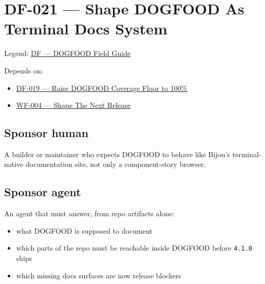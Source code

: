 \chapter{DF-021 --- Shape DOGFOOD As Terminal Docs System}\label{record-082}

\smallskip

Legend: \href{https://github.com/flyingrobots/bijou/blob/1853ad902f6bf219326409e7f743a5a1d6517dbc/docs/legends/DF-dogfood-field-guide.md}{DF --- DOGFOOD Field Guide}

Depends on:

\begin{itemize}
\tightlist
\item
  \href{https://github.com/flyingrobots/bijou/blob/cbd70612140e7a450d764b3c7be1c6af878b99bc/docs/design/DF-019-raise-dogfood-coverage-floor-to-100-percent.md}{DF-019 --- Raise DOGFOOD Coverage Floor to 100\%}
\item
  \href{https://github.com/flyingrobots/bijou/blob/cbd70612140e7a450d764b3c7be1c6af878b99bc/docs/design/WF-004-shape-the-next-release.md}{WF-004 --- Shape The Next Release}
\end{itemize}

\section{Sponsor human}\label{record-082-sponsor-human}

A builder or maintainer who expects DOGFOOD to behave like Bijou's terminal-native documentation site, not only a component-story browser.

\section{Sponsor agent}\label{record-082-sponsor-agent}

An agent that must answer, from repo artifacts alone:

\begin{itemize}
\tightlist
\item
  what DOGFOOD is supposed to document
\item
  which parts of the repo must be reachable inside DOGFOOD before \texttt{4\allowbreak{}.\allowbreak{}1\allowbreak{}.\allowbreak{}0} ships
\item
  which missing docs surfaces are now release blockers
\end{itemize}

